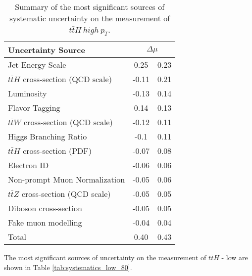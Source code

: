 \begin{table}[H]                                                                                                             
    \centering
    \begin{tabular}{l|cc}                                                                                                    
        \hline\hline                                                                                                         
        Uncertainty Source & \multicolumn{2}{c}{$\Delta \mu$ }  \\
        \hline
        Jet Energy Scale & 0.25 & 0.23 \\
        $t\bar{t}H$ cross-section (QCD scale) & -0.11 & 0.21 \\
        Luminosity & -0.13 & 0.14 \\
        Flavor Tagging & 0.14 & 0.13 \\
        $t\bar{t}W$ cross-section (QCD scale) & -0.12 & 0.11 \\
        Higgs Branching Ratio & -0.1 & 0.11 \\
        $t\bar{t}H$ cross-section (PDF) & -0.07 & 0.08 \\
        Electron ID & -0.06 & 0.06 \\
        Non-prompt Muon Normalization & -0.05 & 0.06 \\
        $t\bar{t}Z$ cross-section (QCD scale) & -0.05 & 0.05 \\
        Diboson cross-section & -0.05 & 0.05 \\
        Fake muon modelling & -0.04 & 0.04 \\
        \hline
        Total & 0.40 & 0.43 \\
        \hline\hline
    \end{tabular}
    \caption{Summary of the most significant sources of systematic uncertainty on the measurement of $t\bar{t}H\ high\ p_T$.}
    \label{tab:systematics_high_80}
\end{table}

The most significant sources of uncertainty on the measurement of $t\bar{t}H$ - low \pt are shown in Table \ref{tab:systematics_low_80}.


